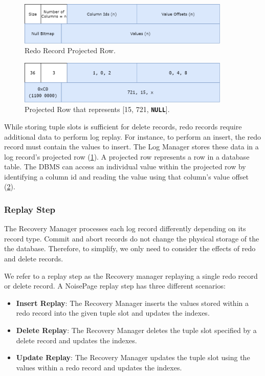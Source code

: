 \documentclass[12pt]{cmuthesis}
\newcommand{\dbSQL}[1]{\texttt{\textbf{#1}}\xspace}
\begin{document}
\begin{figure}[t!]
\centering
\includegraphics[width=0.9\textwidth]{images/Delta.png}
\caption{Redo Record Projected Row.}
\label{fig:projected_row}
\end{figure}
\begin{figure}[t!]
\centering
\includegraphics[width=0.9\textwidth]{images/PRExample.png}
\caption{Projected Row that represents [15, 721, \dbSQL{NULL}].}
\label{fig:projected_row_example}
\end{figure}

 While storing tuple slots is sufficient for delete records, redo records require additional data to perform log replay. For instance, to perform an insert, the redo record must contain the values to insert. The Log Manager stores these data in a log record's projected row (\cref{fig:projected_row}). A projected row represents a row in a database table. The DBMS can access an individual value within the projected row by identifying a column id and reading the value using that column's value offset (\cref{fig:projected_row_example}).

\subsubsection{Replay Step}
The Recovery Manager processes each log record differently depending on its record type. Commit and abort records do not change the physical storage of the the database. Therefore, to simplify, we only need to consider the effects of redo and delete records.

We refer to a replay step as the Recovery manager replaying a single redo record or delete record. A NoisePage replay step has three different scenarios:
\begin{itemize}
    \item \textbf{Insert Replay}: The Recovery Manager inserts the values stored within a redo record into the given tuple slot and updates the indexes.
    \item \textbf{Delete Replay}: The Recovery Manager deletes the tuple slot specified by a delete record and updates the indexes.
    \item \textbf{Update Replay}: The Recovery Manager updates the tuple slot using the values within a redo record and updates the indexes.
\end{itemize}
\end{document}
